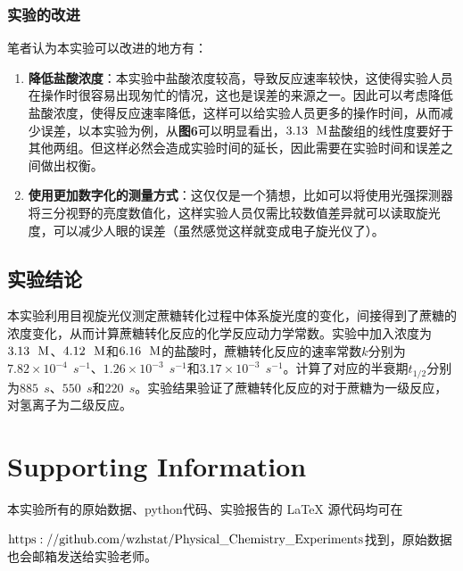 \documentclass[12pt]{article}
\begin{document}
					\subsubsection{实验的改进}
					笔者认为本实验可以改进的地方有：
					\begin{enumerate}
						\item \textbf{降低盐酸浓度}：本实验中盐酸浓度较高，导致反应速率较快，这使得实验人员在操作时很容易出现匆忙的情况，这也是误差的来源之一。因此可以考虑降低盐酸浓度，使得反应速率降低，这样可以给实验人员更多的操作时间，从而减少误差，以本实验为例，从\textbf{图6}可以明显看出，$3.13\ \ {\rm M}$盐酸组的线性度要好于其他两组。但这样必然会造成实验时间的延长，因此需要在实验时间和误差之间做出权衡。\par
						\item \textbf{使用更加数字化的测量方式}：这仅仅是一个猜想，比如可以将使用光强探测器将三分视野的亮度数值化，这样实验人员仅需比较数值差异就可以读取旋光度，可以减少人眼的误差（虽然感觉这样就变成电子旋光仪了）。\par
					\end{enumerate}
				\subsection{实验结论}
				本实验利用目视旋光仪测定蔗糖转化过程中体系旋光度的变化，间接得到了蔗糖的浓度变化，从而计算蔗糖转化反应的化学反应动力学常数。实验中加入浓度为$3.13\ \ {\rm M}$、$4.12\ \ {\rm M}$和$6.16\ \ {\rm M}$的盐酸时，蔗糖转化反应的速率常数$k$分别为$7.82\times10^{-4}\ \ s^{-1}$、$1.26\times10^{-3}\ \ s^{-1}$和$3.17\times10^{-3}\ \ s^{-1}$。计算了对应的半衰期$t_{1/2}$分别为$885\ \ s$、$550\ \ s$和$220\ \ s$。实验结果验证了蔗糖转化反应的对于蔗糖为一级反应，对氢离子为二级反应。


					



	\vbox{}
	\section{Supporting Information}
		本实验所有的原始数据、python代码、实验报告的 LaTeX 源代码均可在\par
		 $\rm{https://github.com/wzhstat/Physical\_Chemistry\_Experiments}$找到，原始数据也会邮箱发送给实验老师。
\vbox{}  


\end{document}
